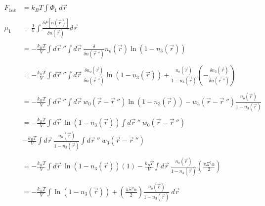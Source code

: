 \documentclass[double,12pt]{beavtex}
\begin{document}
\begin{align}
    F_{1ex} &= k_BT\int \Phi_1~d\vec r \\ \nonumber\\
    \mu_1 &= \frac{1}{V}\int \frac{\delta F[n(\vec r)]}{\delta n(\vec r)} d\vec r \\ \nonumber\\
%
        &= -\frac{k_BT}{V} \int d\vec r~'' \int d\vec r~ \frac{\delta}
        {\delta n(\vec r~'')}n_o(\vec r)\ln(1-n_3(\vec r)) \\ \nonumber\\
%
        &= -\frac{k_BT}{V}\int d\vec r~''\int d\vec r~\frac{\delta n_o(\vec r)}
        {\delta n(\vec r~'')}\ln(1-n_3(\vec r))+\frac{n_o(\vec r)}
          {1-n_3(\vec r)}\left(-\frac{\delta n_3(\vec r)}{\delta n(\vec r~'')}
          \right) \\ \nonumber\\
%
        &= -\frac{k_BT}{V} \int d\vec r~'' \int d\vec r~w_0(\vec r - \vec r~'')
          \ln(1-n_3(\vec r)) - w_3(\vec r - \vec r~'')\frac{n_o(\vec r)}
          {1-n_3(\vec r)} \\ \nonumber\\
%
        &= -\frac{k_BT}{V} \int d\vec r~\ln(1-n_3(\vec r)) \int d \vec r~''  
          ~w_0(\vec r - \vec r~'') \nonumber\\
        &- \frac{k_BT}{V} \int d\vec r ~\frac{n_o(\vec r)}{1-n_3(\vec r)} 
          \int d \vec r~''~w_3(\vec r - \vec r~'')  \\ \\
%
        &= -\frac{k_BT}{V} \int d\vec r ~\ln(1-n_3(\vec r))(1)
          - \frac{k_BT}{V} \int d\vec r ~\frac{n_o(\vec r)}{1-n_3(\vec r)}
          \left(\frac{\pi\Xi^2\alpha}{2}\right) \\ \\
%
        &= -\frac{k_BT}{V}\int\ln(1-n_3(\vec r))+\left(
        \frac{\pi\Xi^2\alpha}{2}\right)\frac{n_o(\vec r)}{1-n_3(\vec r)}~d\vec r
\end{align}
\end{document}
